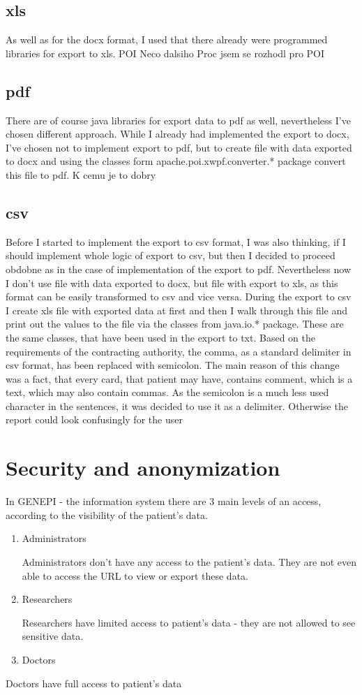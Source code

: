 \documentclass[thesis=B,english]{FITthesis}[2012/10/20]
\begin{document}
\subsection{xls}
As well as for the docx format, I used that there already were programmed libraries for export to xls.
POI 
Neco dalsiho
Proc jsem se rozhodl pro POI
\subsection{pdf}
There are of course java libraries for export data to pdf as well, nevertheless I've chosen different approach. While I already had implemented the export to docx, I've chosen not to implement export to pdf, but to create file with data exported to docx and using the classes form apache.poi.xwpf.converter.* package convert this file to pdf.
K cemu je to dobry
\subsection{csv}
Before I started to implement the export to csv format, I was also thinking, if I should implement whole logic of export to csv, but then I decided to proceed obdobne as in the case of implementation of the export to pdf. Nevertheless now I don't use file with data exported to docx, but file with export to xls, as this format can be easily transformed to csv and vice versa. During the export to csv I create xls file with exported data at first and then I walk through this file and print out the values to the file via the classes from java.io.* package. These are the same classes, that have been used in the export to txt. Based on the requirements of the contracting authority, the comma, as a standard delimiter in csv format, has been replaced with semicolon. The main reason of this change was a fact, that every card, that patient may have, contains comment, which is a text, which may also contain commas. As the semicolon is a much less used character in the sentences, it was decided to use it as a delimiter. Otherwise the report could look confusingly for the user
\section{Security and anonymization}
In GENEPI - the information system there are 3 main levels of an access, according to the visibility of the patient's data.
\begin{enumerate}
\item{Administrators}

Administrators don't have any access to the patient's data. They are not even able to access the URL to view or export these data.
\item{Researchers}

Researchers have limited access to patient's data - they are not allowed to see sensitive data.
\item{Doctors}
\end{enumerate}
Doctors have full access to patient's data
\end{document}
